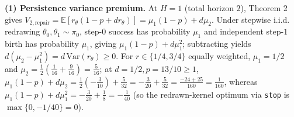 \documentclass[11pt,a4paper]{article}
\begin{document}
\textbf{(1) Persistence variance premium.} At \(H = 1\) (total horizon
\(2\)), Theorem 2 gives
\(V_{2,\mathrm{repair}} = \mathbb{E}[r_\theta(1 - p + d r_\theta)] = \mu_1(1 - p) + d\mu_2\).
Under stepwise i.i.d. redrawing \(\theta_0, \theta_1 \sim \pi_0\),
step-\(0\) success has probability \(\mu_1\) and independent step-\(1\)
birth has probability \(\mu_1\), giving \(\mu_1(1 - p) + d\mu_1^2\);
subtracting yields
\(d(\mu_2 - \mu_1^2) = d\,\mathrm{Var}(r_\theta) \ge 0\). For
\(r \in \{1/4, 3/4\}\) equally weighted, \(\mu_1 = 1/2\) and
\(\mu_2 = \frac{1}{2}(\frac{1}{16} + \frac{9}{16}) = \frac{5}{16}\); at
\(d = 1/2, p = 13/10 \ge 1\),
\(\mu_1(1-p) + d\mu_2 = \frac{1}{2}(-\frac{3}{10}) + \frac{5}{32} = -\frac{3}{20} + \frac{5}{32} = \frac{-24 + 25}{160} = \frac{1}{160}\),
whereas
\(\mu_1(1-p) + d\mu_1^2 = -\frac{3}{20} + \frac{1}{8} = -\frac{1}{40}\)
(so the redrawn-kernel optimum via \texttt{stop} is
\(\max\{0, -1/40\} = 0\)).
\end{document}
